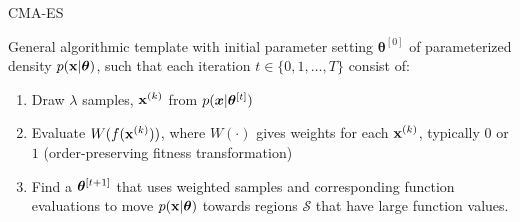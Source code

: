 \documentclass[11pt,compress,t,notes=noshow, xcolor=table]{beamer}
\begin{document}
\begin{frame}{CMA-ES}

\begin{minipage}{0.62\textwidth}
General algorithmic template with initial parameter setting $\bm{\theta}^{[0]}$ of parameterized density $p(\mathbf{x}|\bm{\theta})$, such that each iteration $t \in \{0,1,\dots, T\}$ consist of:

\begin{enumerate}
\item Draw $\lambda$ samples, $\mathbf{x}^{(k)}$ from $p(\bm{x}|\bm{\theta}^{[t]})$
\item Evaluate $W(f(\mathbf{x}^{(k)}))$, where $W(\cdot)$ gives weights for each $\mathbf{x}^{(k)}$, typically $0$ or $1$ (order-preserving fitness transformation)
\item Find a $\bm{\theta}^{[t+1]}$ that uses weighted samples and corresponding function evaluations to move $p(\mathbf{x}|\bm{\theta})$ towards regions $\mathcal{S}$ that have large function values.
\end{enumerate}


\end{minipage}
\end{frame}
\end{document}
